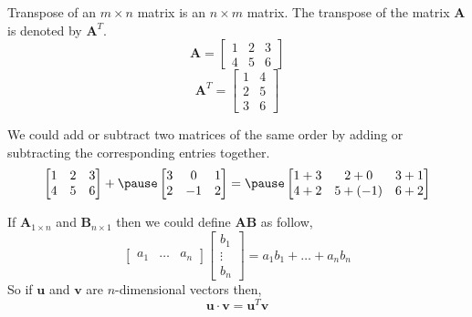 \documentclass[12pt,aspectratio=169]{beamer}
\begin{document}
\begin{frame}
Transpose of an $m\times n$ matrix is an $n\times m$ matrix. The transpose of the matrix $\mathbf{A}$ is denoted by $\mathbf{A}^T$.\pause
\[\mathbf{A}=
\begin{bmatrix}
1 & 2 & 3\\
4 & 5 & 6
\end{bmatrix}
\]\pause
\[\mathbf{A}^T=
\begin{bmatrix}
1 & 4\\
2 & 5\\
3 & 6
\end{bmatrix}
\]
\end{frame}

\begin{frame}
We could add or subtract two matrices of the same order by adding or subtracting the corresponding entries together.\pause
\[
\begin{bmatrix}
1 & 2 & 3\\
4 & 5 & 6
\end{bmatrix}
+\pause
\begin{bmatrix}
3 & 0 & 1\\
2 & -1 & 2
\end{bmatrix}
=\pause
\begin{bmatrix}
1+3 & 2+0 & 3+1\\
4+2 & 5+(-1) & 6+2
\end{bmatrix}
\]
\end{frame}

\begin{frame}
If $\mathbf{A}_{1\times n}$ and $\mathbf{B}_{n\times 1}$ then we could define $\mathbf{AB}$ as follow,\pause
\[
\begin{bmatrix}
a_1 & \dots & a_n
\end{bmatrix}
\begin{bmatrix}
b_1\\
\vdots\\
b_n
\end{bmatrix}=
a_1b_1+\dots + a_nb_n
\]
So if $\mathbf{u}$ and $\mathbf{v}$ are $n$-dimensional vectors then, \pause
\[
\mathbf{u}\cdot \mathbf{v}=\mathbf{u}^T\mathbf{v}
\]
\end{frame}
\end{document}
